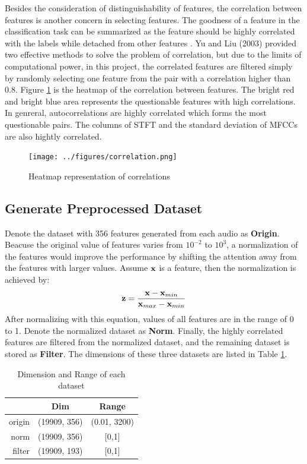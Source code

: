 \documentclass[sigconf ,nonacm]{acmart}
\begin{document}
Besides the consideration of distinguishability of features, the correlation between features is another concern in selecting features. The goodness of a feature in the classification task can be summarized as the feature should be highly correlated with the labels while detached from other features \cite{yu2003feature}. Yu and Liu (2003) provided two effective methods to solve the problem of correlation, but due to the limits of computational power, in this project, the correlated features are filtered simply by randomly selecting one feature from the pair with a correlation higher than 0.8. Figure \ref{fig:corr} is the heatmap of the correlation between features. The bright red and bright blue area represents the questionable features with high correlations. In genreral, autocorrelations are highly correlated which forms the most questionable pairs. The columns of STFT and the standard deviation of MFCCs are also hightly correlated.

\begin{figure}
  \texttt{[image: ../figures/correlation.png]}
  \caption{Heatmap representation of correlations}
  \label{fig:corr}
\end{figure}


\subsection{Generate Preprocessed Dataset}
Denote the dataset with 356 features generated from each audio as \textbf{Origin}. Beacuse the original value of features varies from $10^{-2}$ to $10^3$, a normalization of the features would improve the performance by shifting the attention away from the features with larger values. Assume ${\bf x}$ is a feature, then the normalization is achieved by:
\begin{align*}
{\bf z} = \frac{{\bf x}-{\bf x}_{min}}{{\bf x}_{max}-{\bf x}_{min}}
\end{align*}
After normalizing with this equation, values of all features are in the range of 0 to 1. Denote the normalized dataset as \textbf{Norm}. Finally,  the highly correlated features are filtered from the normalized dataset, and the remaining dataset is stored as \textbf{Filter}. The dimensions of these three datasets are listed in Table \ref{tabel:dataset}.

\begin{table}[b]
\begin{tabular}{r|c|c}
       & Dim & Range \\ \hline
origin & (19909, 356) & (0.01, 3200)\\
norm & (19909, 356) & [0,1]\\
filter & (19909, 193) & [0,1]
\end{tabular}
\caption{Dimension and Range of each dataset}
\label{tabel:dataset}
\end{table}
\end{document}
